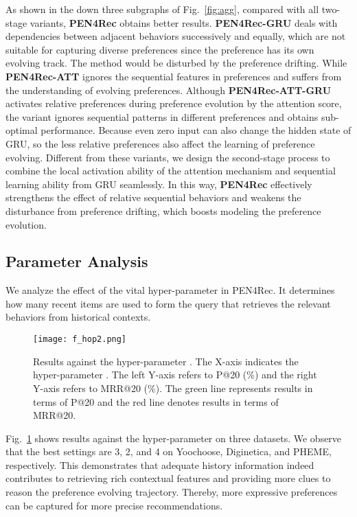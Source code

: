 \documentclass[runningheads]{llncs}
\begin{document}
As shown in the down three subgraphs of Fig.~\ref{fig:agg}, compared with all two-stage variants, \textbf{PEN4Rec} obtains better results. 
\textbf{PEN4Rec-GRU} deals with dependencies between adjacent behaviors successively and equally, which are not suitable for capturing diverse preferences since the preference has its own evolving track. The method would be disturbed by the preference drifting. 
While \textbf{PEN4Rec-ATT} ignores the sequential features in preferences and suffers from the understanding of evolving preferences.
Although \textbf{PEN4Rec-ATT-GRU} activates relative preferences during preference evolution by the attention score, the variant ignores sequential patterns in different preferences and obtains sub-optimal performance.
Because even zero input can also change the hidden state of GRU, so the less relative preferences also affect the learning of preference evolving.
Different from these variants, we design the second-stage process to combine the local activation ability of the attention mechanism and sequential learning ability from GRU seamlessly. 
In this way, \textbf{PEN4Rec} effectively strengthens the effect of relative sequential behaviors and weakens the disturbance from preference drifting, which boosts modeling the preference evolution. 

\subsection{Parameter Analysis}
We analyze the effect of the vital hyper-parameter  in PEN4Rec. It determines how many recent items are used to form the query that retrieves the relevant behaviors from historical contexts.

\begin{figure}[t]
  \centering
  \texttt{[image: f\_hop2.png]}
  \caption{Results against the hyper-parameter . The X-axis indicates the hyper-parameter . The left Y-axis refers to P@20 (\%) and the right Y-axis refers to MRR@20 (\%). The green line represents results in terms of P@20 and the red line denotes results in terms of MRR@20.}
  \label{fig:hop}
\end{figure}

Fig.~\ref{fig:hop} shows results against the hyper-parameter  on three datasets.
We observe that the best settings are 3, 2, and 4 on Yoochoose, Diginetica, and PHEME, respectively.  
This demonstrates that adequate history information indeed contributes to retrieving rich contextual features and providing more clues to reason the preference evolving trajectory. Thereby, more expressive preferences can be captured for more precise recommendations.
 
\end{document}
